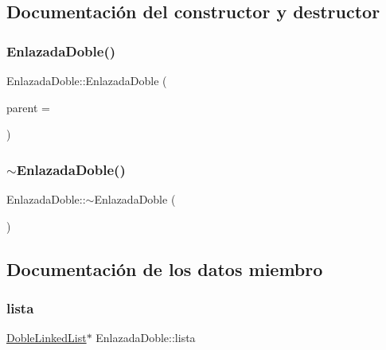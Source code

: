 \subsection{Documentación del constructor y destructor}
\mbox{\label{class_enlazada_doble_a5b55fdc97b66257ed864966d19a27439}} 
\subsubsection{\texorpdfstring{Enlazada\+Doble()}{EnlazadaDoble()}}
{\footnotesize\ttfamily Enlazada\+Doble\+::\+Enlazada\+Doble (\begin{DoxyParamCaption}\item[{Q\+Widget $\ast$}]{parent = {} }\end{DoxyParamCaption})\hspace{0.3cm}{\ttfamily [explicit]}}

\mbox{\label{class_enlazada_doble_a570a769129249be3c786e6ac21253bb8}} 
\subsubsection{\texorpdfstring{$\sim$\+Enlazada\+Doble()}{~EnlazadaDoble()}}
{\footnotesize\ttfamily Enlazada\+Doble\+::$\sim$\+Enlazada\+Doble (\begin{DoxyParamCaption}{ }\end{DoxyParamCaption})}



\subsection{Documentación de los datos miembro}
\mbox{\label{class_enlazada_doble_a041d141e37c6efade1cae5ea9f5d982c}} 
\subsubsection{\texorpdfstring{lista}{lista}}
{\footnotesize\ttfamily \mbox{\hyperlink{class_doble_linked_list}{Doble\+Linked\+List}}$\ast$ Enlazada\+Doble\+::lista}

